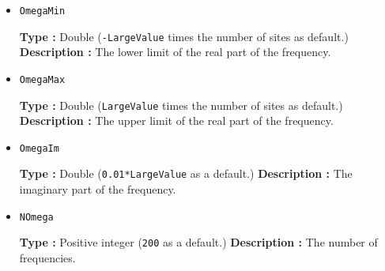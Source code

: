 \begin{itemize}
\item \verb|OmegaMin|

    {\bf Type :} Double (\verb|-LargeValue| times the number of sites as default.)
    {\bf Description :} The lower limit of the real part of the frequency.
    
  \item \verb|OmegaMax|

    {\bf Type :} Double (\verb|LargeValue| times the number of sites as default.)
    {\bf Description :} The upper limit of the real part of the frequency.

  \item \verb|OmegaIm|

    {\bf Type :} Double (\verb|0.01*LargeValue| as a default.)
    {\bf Description :} The imaginary part of the frequency.

  \item \verb|NOmega|
  
    {\bf Type :} Positive integer (\verb|200| as a default.)
    {\bf Description :} The number of frequencies.

\end{itemize}

